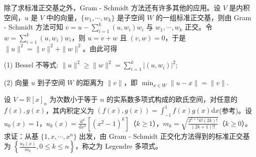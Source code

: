 \documentclass[../../main.tex]{subfiles}%
\begin{document}
除了求标准正交基之外，Gram - Schmidt 方法还有许多其他的应用。设 $V$ 是内积空间，$u$ 是 $V$ 中的向量，$\{w_1,\cdots,w_k\}$ 是子空间 $W$ 的一组标准正交基，则由 Gram - Schmidt 方法可知 $v = u - \sum_{i = 1}^{k}(u,w_i)w_i$ 与 $w_1,\cdots,w_k$ 正交。令 $w = \sum_{i = 1}^{k}(u,w_i)w_i$，则 $u = v + w$ 且 $(v,w) = 0$，于是 $\|u\|^2 = \|v\|^2 + \|w\|^2$。由此可得

(1) Bessel 不等式: $\|u\|^2\geqslant \|w\|^2 = \sum_{i = 1}^{k}|(u,w_i)|^2$;

(2) 向量 $u$ 到子空间 $W$ 的距离为 $\|v\|$，即 $\min_{x\in W}\|u - x\| = \|v\|$. 

\begin{example}\label{example:例9.11}
设 $V = \mathbb{R}[x]_n$ 为次数小于等于 $n$ 的实系数多项式构成的欧氏空间，对任意的 $f(x),g(x)$，其内积定义为 $(f(x),g(x)) = \int_{-1}^{1}f(x)g(x)\mathrm{d}x$(参考)。设 $u_0(x)=1$，$u_k(x)=\frac{\mathrm{d}^k}{\mathrm{d}x^k}[(x^2 - 1)^k]$（$k\geqslant 1$），$m_k = \sqrt{\frac{2^{k + 1}k!(2k)!}{(2k + 1)!!}}$（$k\geqslant 0$）。求证：从基 $\{1,x,\cdots,x^n\}$ 出发，由 Gram - Schmidt 正交化方法得到的标准正交基为 $\left\{\frac{u_k(x)}{m_k},0\leqslant  k\leqslant  n\right\}$，称之为 Legendre 多项式。
\end{example}
\end{document}
